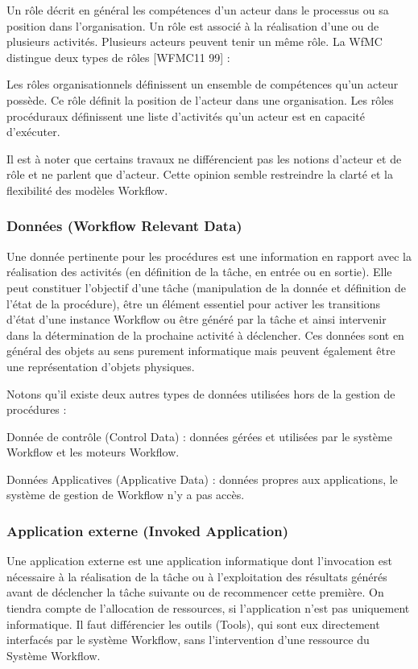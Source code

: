  	 
 	 Un rôle décrit en général les compétences d’un acteur dans le processus ou sa position dans l’organisation. Un rôle est associé à la réalisation d’une ou de plusieurs activités. Plusieurs acteurs peuvent tenir un même rôle. La WfMC distingue deux types de rôles [WFMC11 99] :
 	 
 	 Les rôles organisationnels définissent un ensemble de compétences qu’un acteur possède. Ce rôle définit la position de l’acteur dans une organisation. Les rôles procéduraux définissent une liste d’activités qu’un acteur est en capacité d’exécuter. 
 	 
 	 Il est à noter que certains travaux ne différencient pas les notions d’acteur et de rôle et ne parlent que d’acteur. Cette opinion semble restreindre la clarté et la flexibilité des modèles Workflow. 
 	 
 	 	 \subsubsection{Données (Workflow Relevant Data) }
 	 
 	 Une donnée pertinente pour les procédures est une information en rapport avec la réalisation des activités (en définition de la tâche, en entrée ou en sortie). Elle peut constituer l’objectif d’une tâche (manipulation de la donnée et définition de l’état de la procédure), être un élément essentiel pour activer les transitions d’état d’une instance Workflow ou être généré par la tâche et ainsi intervenir dans la détermination de la prochaine activité à déclencher. Ces données sont en général des objets au sens purement informatique mais peuvent également être une représentation d’objets physiques. 
 	 
 	 Notons qu’il existe deux autres types de données utilisées hors de la gestion de procédures : 
 	 
 	 Donnée de contrôle (Control Data) : données gérées et utilisées par le système Workflow et les moteurs Workflow.
 	 
 	 Données Applicatives (Applicative Data) : données propres aux applications, le système de gestion de Workflow n’y a pas accès. 
 	 
 	 \subsubsection{ Application externe (Invoked Application) }
 	 
 	 Une application externe est une application informatique dont l’invocation est nécessaire à la réalisation de la tâche ou à l’exploitation des résultats générés avant de déclencher la tâche suivante ou de recommencer cette première. On tiendra compte de l’allocation de ressources, si l’application n’est pas uniquement informatique. Il faut différencier les outils (Tools), qui sont eux directement interfacés par le système Workflow, sans l’intervention d’une ressource du Système Workflow.
 	 
